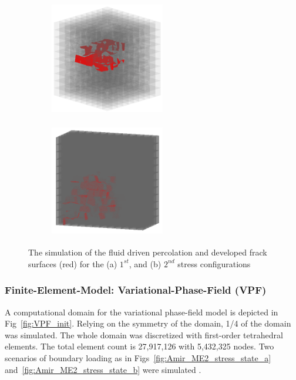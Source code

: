 \begin{figure}[!ht]
\begin{subfigure}[c]{0.48\textwidth}
\includegraphics[width=5cm,height=5cm]{figures/Amir_ME2_LEM_a_model_Fracture.png}
\subcaption{}
\label{fig:Amir_ME2_LEM_a_model_Fracture}
\end{subfigure}
\hfill
\begin{subfigure}[c]{0.48\textwidth}
\includegraphics[width=5cm,height=5cm]{figures/Amir_ME2_LEM_b_model_Fracture.png}
\subcaption{}
\label{fig:Amir_ME2_LEM_b_model_Fracture}
\end{subfigure}
\caption{The simulation of the fluid driven percolation and developed frack surfaces (red) for the (a) $1^{st}$, and (b) $2^{nd}$ stress configurations}
\end{figure}

\subsubsection*{Finite-Element-Model: Variational-Phase-Field (VPF)}
A computational domain for the variational phase-field model is depicted in Fig~\ref{fig:VPF_init}.
Relying on the symmetry of the domain, 1/4 of the domain was simulated. 
The whole domain was discretized with first-order tetrahedral elements.
The total element count is 27,917,126 with 5,432,325 nodes.
Two scenarios of boundary loading as in Figs~\ref{fig:Amir_ME2_stress_state_a} and~\ref{fig:Amir_ME2_stress_state_b} were simulated  .

